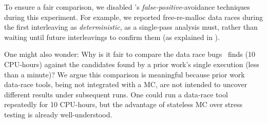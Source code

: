 To ensure a fair comparison, we disabled \landslide's {\em false-positive}-avoidance techniques during this experiment.
For example, we reported free-re-malloc data races during the first interleaving as {\em deterministic}, as a single-pass analysis must,
rather than waiting until future interleavings to confirm them (as explained in \sect{\ref{sec:free-re-malloc}}).


One might also wonder: Why is it fair to compare the data race bugs \quicksand~finds (10 CPU-hours)
against the candidates found by a prior work's single execution (less than a minute)?
We argue this comparison is meaningful because prior work data-race tools, being not integrated with a MC,
are not intended to uncover different results under subsequent runs.
One could run a data-race tool repeatedly for 10 CPU-hours, but the advantage of stateless MC over stress testing is already well-understood.



